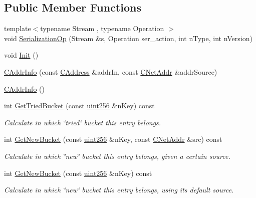 \subsection*{Public Member Functions}
\begin{DoxyCompactItemize}
\item 
{\footnotesize template$<$typename Stream , typename Operation $>$ }\\void \mbox{\hyperlink{class_c_addr_info_ae80fdec7d3b48278033ea2280f66e68b}{Serialization\+Op}} (Stream \&s, Operation ser\+\_\+action, int n\+Type, int n\+Version)
\item 
void \mbox{\hyperlink{class_c_addr_info_af1df1f12bc71ed7f3debae61058b9b9f}{Init}} ()
\item 
\mbox{\hyperlink{class_c_addr_info_a27e773233e8d7e7d183f138d24cc40ef}{C\+Addr\+Info}} (const \mbox{\hyperlink{class_c_address}{C\+Address}} \&addr\+In, const \mbox{\hyperlink{class_c_net_addr}{C\+Net\+Addr}} \&addr\+Source)
\item 
\mbox{\hyperlink{class_c_addr_info_ae14c3a91bb669e5580be1d3767264187}{C\+Addr\+Info}} ()
\item 
int \mbox{\hyperlink{class_c_addr_info_a11e2712f11c0d92c75976e90f2c5003e}{Get\+Tried\+Bucket}} (const \mbox{\hyperlink{classuint256}{uint256}} \&n\+Key) const
\begin{DoxyCompactList}\small\item\em Calculate in which \char`\"{}tried\char`\"{} bucket this entry belongs. \end{DoxyCompactList}\item 
int \mbox{\hyperlink{class_c_addr_info_ae4459cd7719834bbcf77874757c6875e}{Get\+New\+Bucket}} (const \mbox{\hyperlink{classuint256}{uint256}} \&n\+Key, const \mbox{\hyperlink{class_c_net_addr}{C\+Net\+Addr}} \&src) const
\begin{DoxyCompactList}\small\item\em Calculate in which \char`\"{}new\char`\"{} bucket this entry belongs, given a certain source. \end{DoxyCompactList}\item 
int \mbox{\hyperlink{class_c_addr_info_a04ac79764971242edce1e82aefb2aea0}{Get\+New\+Bucket}} (const \mbox{\hyperlink{classuint256}{uint256}} \&n\+Key) const
\begin{DoxyCompactList}\small\item\em Calculate in which \char`\"{}new\char`\"{} bucket this entry belongs, using its default source. \end{DoxyCompactList}\item 

\end{DoxyCompactItemize}
